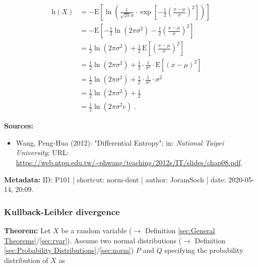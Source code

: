 \documentclass[a4paper,12pt,twoside]{book}
\begin{document}
\begin{equation} \label{eq:norm-dent-mvn-dent-s1}
\begin{split}
\mathrm{h}(X) &= - \mathrm{E}\left[ \ln \left( \frac{1}{\sqrt{2 \pi} \sigma} \cdot \exp \left[ -\frac{1}{2} \left( \frac{x-\mu}{\sigma} \right)^2 \right] \right) \right] \\
&= - \mathrm{E}\left[ - \frac{1}{2} \ln(2\pi\sigma^2) - \frac{1}{2} \left( \frac{x-\mu}{\sigma} \right)^2 \right] \\
&= \frac{1}{2} \ln(2 \pi \sigma^2) + \frac{1}{2} \, \mathrm{E}\left[ \left( \frac{x-\mu}{\sigma} \right)^2 \right] \\
&= \frac{1}{2} \ln(2 \pi \sigma^2) + \frac{1}{2} \cdot \frac{1}{\sigma^2} \cdot \mathrm{E}\left[ (x-\mu)^2 \right] \\
&= \frac{1}{2} \ln(2 \pi \sigma^2) + \frac{1}{2} \cdot \frac{1}{\sigma^2} \cdot \sigma^2 \\
&= \frac{1}{2} \ln(2 \pi \sigma^2) + \frac{1}{2} \\
&= \frac{1}{2} \ln(2 \pi \sigma^2 e) \; .
\end{split}
\end{equation}


\vspace{1em}
\textbf{Sources:}
\begin{itemize}
\item Wang, Peng-Hua (2012): "Differential Entropy"; in: \textit{National Taipei University}; URL: \url{https://web.ntpu.edu.tw/~phwang/teaching/2012s/IT/slides/chap08.pdf}.
\end{itemize}


\vspace{1em}
\textbf{Metadata:} ID: P101 | shortcut: norm-dent | author: JoramSoch | date: 2020-05-14, 20:09.
\vspace{1em}



\subsubsection[\textbf{Kullback-Leibler divergence}]{Kullback-Leibler divergence} \label{sec:norm-kl}
\setcounter{equation}{0}

\textbf{Theorem:} Let $X$ be a random variable ($\rightarrow$ Definition \ref{sec:General Theorems}/\ref{sec:rvar}). Assume two normal distributions ($\rightarrow$ Definition \ref{sec:Probability Distributions}/\ref{sec:norm}) $P$ and $Q$ specifying the probability distribution of $X$ as
\end{document}
